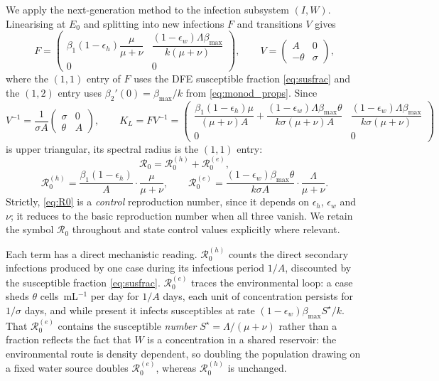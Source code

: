 \documentclass[11pt]{article}
\theoremstyle{plain}
\theoremstyle{definition}
\theoremstyle{remark}
\newcommand{\Rz}{\mathcal{R}_0}
\newcommand{\Rzh}{\mathcal{R}_0^{(h)}}
\newcommand{\Rze}{\mathcal{R}_0^{(e)}}
\begin{document}
We apply the next-generation method \cite{vandendriessche2002reproduction} to the infection subsystem $(I,W)$. Linearising at $E_0$ and splitting into new infections $F$ and transitions $V$ gives
\[
F=\begin{pmatrix} \beta_1(1-\epsilon_h)\dfrac{\mu}{\mu+\nu} & \dfrac{(1-\epsilon_w)\Lambda\beta_{\max}}{k(\mu+\nu)}\\[8pt] 0&0\end{pmatrix},
\qquad
V=\begin{pmatrix} A & 0\\ -\theta & \sigma\end{pmatrix},
\]
where the $(1,1)$ entry of $F$ uses the DFE susceptible fraction \eqref{eq:susfrac} and the $(1,2)$ entry uses $\beta_2'(0)=\beta_{\max}/k$ from \eqref{eq:monod_props}. Since
\[
V^{-1}=\frac{1}{\sigma A}\begin{pmatrix}\sigma&0\\ \theta& A\end{pmatrix},
\qquad
K_L=FV^{-1}=\begin{pmatrix}\dfrac{\beta_1(1-\epsilon_h)\mu}{(\mu+\nu)A}+\dfrac{(1-\epsilon_w)\Lambda\beta_{\max}\theta}{k\sigma(\mu+\nu)A} & \dfrac{(1-\epsilon_w)\Lambda\beta_{\max}}{k\sigma(\mu+\nu)}\\[8pt] 0&0\end{pmatrix}
\]
is upper triangular, its spectral radius is the $(1,1)$ entry:
\begin{equation}\label{eq:R0}
\Rz=\Rzh+\Rze,
\end{equation}
\begin{equation}\label{eq:R0h}
\Rzh=\frac{\beta_1(1-\epsilon_h)}{A}\cdot\frac{\mu}{\mu+\nu},
\qquad
\Rze=\frac{(1-\epsilon_w)\beta_{\max}\theta}{k\sigma A}\cdot\frac{\Lambda}{\mu+\nu}.
\end{equation}
Strictly, \eqref{eq:R0} is a \emph{control} reproduction number, since it depends on $\epsilon_h$, $\epsilon_w$ and $\nu$; it reduces to the basic reproduction number when all three vanish. We retain the symbol $\Rz$ throughout and state control values explicitly where relevant.

Each term has a direct mechanistic reading. $\Rzh$ counts the direct secondary infections produced by one case during its infectious period $1/A$, discounted by the susceptible fraction \eqref{eq:susfrac}. $\Rze$ traces the environmental loop: a case sheds $\theta$ cells~mL$^{-1}$ per day for $1/A$ days, each unit of concentration persists for $1/\sigma$ days, and while present it infects susceptibles at rate $(1-\epsilon_w)\beta_{\max}S^\star/k$. That $\Rze$ contains the susceptible \emph{number} $S^\star=\Lambda/(\mu+\nu)$ rather than a fraction reflects the fact that $W$ is a concentration in a shared reservoir: the environmental route is density dependent, so doubling the population drawing on a fixed water source doubles $\Rze$, whereas $\Rzh$ is unchanged.
\end{document}
